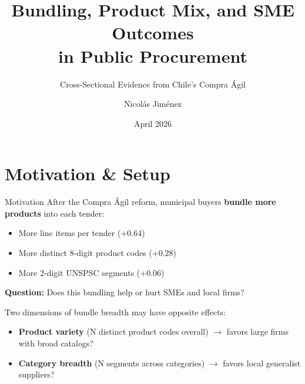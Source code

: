 \documentclass[9pt,aspectratio=169]{beamer}
\title{Bundling, Product Mix, and SME Outcomes\\in Public Procurement}
\subtitle{Cross-Sectional Evidence from Chile's Compra Ágil}
\author{Nicolás Jiménez}
\date{April 2026}
\institute{Yale University}
\begin{document}
\maketitle

\section{Motivation \& Setup}

\begin{frame}{Motivation}
After the Compra Ágil reform, municipal buyers \textbf{bundle more products} into each tender:
\begin{itemize}
  \item More line items per tender (+0.64)
  \item More distinct 8-digit product codes (+0.28)
  \item More 2-digit UNSPSC segments (+0.06)
\end{itemize}

\bigskip
\textbf{Question:} Does this bundling help or hurt SMEs and local firms?

\bigskip
Two dimensions of bundle breadth may have opposite effects:
\begin{itemize}
  \item \textbf{Product variety} (N distinct product codes overall) $\to$ favors large firms with broad catalogs?
  \item \textbf{Category breadth} (N segments across categories) $\to$ favors local generalist suppliers?
\end{itemize}
\end{frame}
\end{document}
